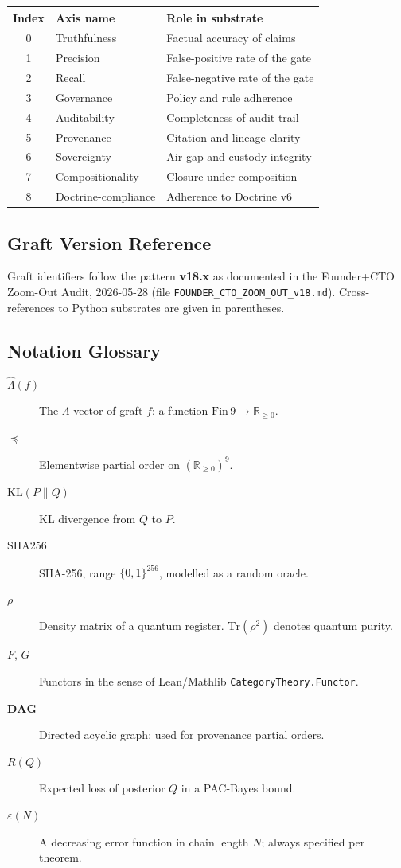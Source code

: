 \begin{center}
\begin{tabular}{cll}
\hline
Index & Axis name & Role in substrate \\
\hline
0 & Truthfulness   & Factual accuracy of claims \\
1 & Precision      & False-positive rate of the gate \\
2 & Recall         & False-negative rate of the gate \\
3 & Governance     & Policy and rule adherence \\
4 & Auditability   & Completeness of audit trail \\
5 & Provenance     & Citation and lineage clarity \\
6 & Sovereignty    & Air-gap and custody integrity \\
7 & Compositionality & Closure under composition \\
8 & Doctrine-compliance & Adherence to Doctrine v6 \\
\hline
\end{tabular}
\end{center}

\subsection*{Graft Version Reference}

Graft identifiers follow the pattern \textbf{v18.x} as documented in
the Founder+CTO Zoom-Out Audit, 2026-05-28 (file
\texttt{FOUNDER\_CTO\_ZOOM\_OUT\_v18.md}).  Cross-references to
Python substrates are given in parentheses.

\subsection*{Notation Glossary}

\begin{description}
  \item[$\hat{\Lambda}(f)$] The $\Lambda$-vector of graft $f$:
        a function $\mathrm{Fin}\,9 \to \mathbb{R}_{\geq 0}$.
  \item[$\preceq$] Elementwise partial order on $(\mathbb{R}_{\geq 0})^9$.
  \item[$\mathrm{KL}(P \| Q)$] KL divergence from $Q$ to $P$.
  \item[$\mathrm{SHA256}$] SHA-256, range $\{0,1\}^{256}$, modelled as
        a random oracle.
  \item[$\rho$] Density matrix of a quantum register.
        $\mathrm{Tr}(\rho^2)$ denotes quantum purity.
  \item[$F$, $G$] Functors in the sense of Lean/Mathlib
        \texttt{CategoryTheory.Functor}.
  \item[$\mathbf{DAG}$] Directed acyclic graph; used for provenance
        partial orders.
  \item[$R(Q)$] Expected loss of posterior $Q$ in a PAC-Bayes bound.
  \item[$\varepsilon(N)$] A decreasing error function in chain
        length $N$; always specified per theorem.
\end{description}


